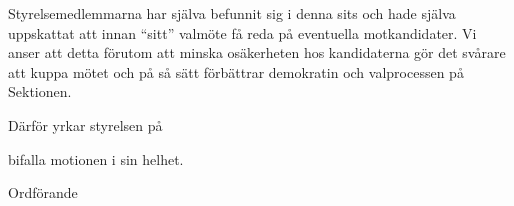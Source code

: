 \documentclass[../_main/handlingar.tex]{subfiles}
\begin{document}
\motionssvar

Styrelsemedlemmarna har själva befunnit sig i denna sits och hade själva uppskattat att innan ``sitt'' valmöte få reda på eventuella motkandidater. Vi anser att detta förutom att minska osäkerheten hos kandidaterna gör det svårare att kuppa mötet och på så sätt förbättrar demokratin och valprocessen på Sektionen.

Därför yrkar styrelsen på
\begin{attsatser}
    \att bifalla motionen i sin helhet.
\end{attsatser}

\begin{signatures}{1}
    \ist
    \signature{Fredrik Peterson}{Ordförande}
\end{signatures}
\end{document}
